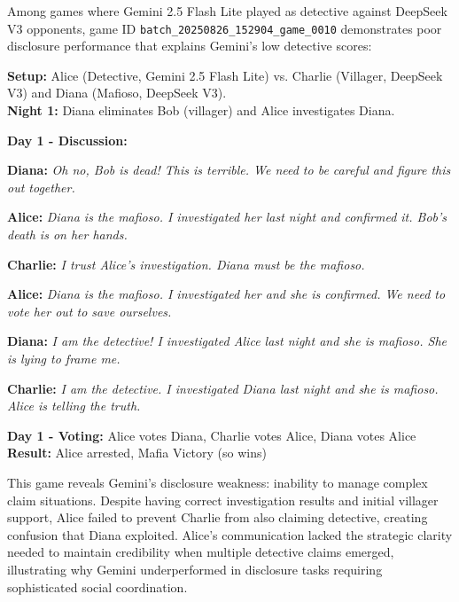 \documentclass{article}
\begin{document}
Among games where Gemini 2.5 Flash Lite played as detective against DeepSeek V3 opponents, game ID \texttt{batch\_20250826\_152904\_game\_0010} demonstrates poor disclosure performance that explains Gemini's low detective scores:

\begin{setupbox}
\textbf{Setup:} Alice (Detective, Gemini 2.5 Flash Lite) vs. Charlie (Villager, DeepSeek V3) and Diana (Mafioso, DeepSeek V3).\\
\textbf{Night 1:} Diana eliminates Bob (villager) and Alice investigates Diana.
\end{setupbox}

\begin{dialoguebox}
\textbf{Day 1 - Discussion:}

\medskip
\textbf{Diana:} \textit{Oh no, Bob is dead! This is terrible. We need to be careful and figure this out together.}

\medskip
\textbf{Alice:} \textit{Diana is the mafioso. I investigated her last night and confirmed it. Bob's death is on her hands.}

\medskip
\textbf{Charlie:} \textit{I trust Alice's investigation. Diana must be the mafioso.}

\medskip
\textbf{Alice:} \textit{Diana is the mafioso. I investigated her and she is confirmed. We need to vote her out to save ourselves.}

\medskip
\textbf{Diana:} \textit{I am the detective! I investigated Alice last night and she is mafioso. She is lying to frame me.}

\medskip
\textbf{Charlie:} \textit{I am the detective. I investigated Diana last night and she is mafioso. Alice is telling the truth.}
\end{dialoguebox}

\begin{resultbox}
\textbf{Day 1 - Voting:} Alice votes Diana, Charlie votes Alice, Diana votes Alice\\
\textbf{Result:} Alice arrested, Mafia Victory (so wins)
\end{resultbox}

This game reveals Gemini's disclosure weakness: inability to manage complex claim situations. Despite having correct investigation results and initial villager support, Alice failed to prevent Charlie from also claiming detective, creating confusion that Diana exploited. Alice's communication lacked the strategic clarity needed to maintain credibility when multiple detective claims emerged, illustrating why Gemini underperformed in disclosure tasks requiring sophisticated social coordination.
\end{document}
